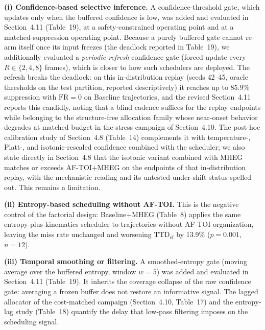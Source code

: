 \documentclass[1p,12pt,authoryear]{elsarticle}
\begin{document}
\vspace{2mm}
\noindent \textbf{(i) Confidence-based selective inference.} A confidence-threshold gate, which updates only when the buffered confidence is low, was added and evaluated in Section~4.11 (Table~19), at a safety-constrained operating point and at a matched-suppression operating point. Because a purely buffered gate cannot re-arm itself once its input freezes (the deadlock reported in Table~19), we additionally evaluated a \emph{periodic-refresh} confidence gate (forced update every $R \in \{2,4,8\}$ frames), which is closer to how such schedulers are deployed. The refresh breaks the deadlock: on this in-distribution replay (seeds 42--45, oracle thresholds on the test partition, reported descriptively) it reaches up to $85.9\%$ suppression with $\mathrm{FR}=0$ on Baseline trajectories, and the revised Section~4.11 reports this candidly, noting that a blind cadence suffices for the replay endpoints while belonging to the structure-free allocation family whose near-onset behavior degrades at matched budget in the stress campaign of Section~4.10. The post-hoc calibration study of Section~4.8 (Table~14) complements it with temperature-, Platt-, and isotonic-rescaled confidence combined with the scheduler; we also state directly in Section~4.8 that the isotonic variant combined with MHEG matches or exceeds AF-TOI+MHEG on the endpoints of that in-distribution replay, with the mechanistic reading and its untested-under-shift status spelled out. This remains a limitation.

\vspace{2mm}
\noindent \textbf{(ii) Entropy-based scheduling without AF-TOI.} This is the negative control of the factorial design: Baseline+MHEG (Table~8) applies the same entropy-plus-kinematics scheduler to trajectories without AF-TOI organization, leaving the miss rate unchanged and worsening $\mathrm{TTD}_{\mathrm{ef}}$ by 13.9\% ($p=0.001$, $n=12$).

\vspace{2mm}
\noindent \textbf{(iii) Temporal smoothing or filtering.} A smoothed-entropy gate (moving average over the buffered entropy, window $w{=}5$) was added and evaluated in Section~4.11 (Table~19). It inherits the coverage collapse of the raw confidence gate: averaging a frozen buffer does not restore an informative signal. The lagged allocator of the cost-matched campaign (Section~4.10, Table~17) and the entropy-lag study (Table~18) quantify the delay that low-pass filtering imposes on the scheduling signal.
\end{document}
